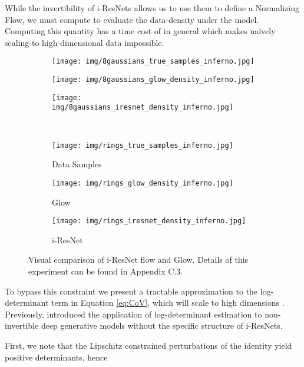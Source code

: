 \documentclass{article}
\begin{document}
While the invertibility of i-ResNets allows us to use them to define a Normalizing Flow, we must compute  to evaluate the data-density under the model. Computing this quantity has a time cost of   in general which makes na\"{i}vely scaling to high-dimensional data impossible. 



\begin{figure}
    \centering
    \begin{subfigure}[b]{0.33\linewidth}
    \centering
    \texttt{[image: img/8gaussians\_true\_samples\_inferno.jpg]}
    \end{subfigure}\begin{subfigure}[b]{0.33\linewidth}
    \centering
    \texttt{[image: img/8gaussians\_glow\_density\_inferno.jpg]}
    \end{subfigure}\begin{subfigure}[b]{0.33\linewidth}
    \centering
    \texttt{[image: img/8gaussians\_iresnet\_density\_inferno.jpg]}
    \end{subfigure}\\
    \begin{subfigure}[b]{0.33\linewidth}
    \centering
    \texttt{[image: img/rings\_true\_samples\_inferno.jpg]}
    \caption*{Data Samples}
    \end{subfigure}\begin{subfigure}[b]{0.33\linewidth}
    \centering
    \texttt{[image: img/rings\_glow\_density\_inferno.jpg]}
    \caption*{Glow}
    \end{subfigure}\begin{subfigure}[b]{0.33\linewidth}
    \centering
    \texttt{[image: img/rings\_iresnet\_density\_inferno.jpg]}
    \caption*{i-ResNet}
    \end{subfigure}
    \caption{Visual comparison of i-ResNet flow and Glow. Details of this experiment can be found in Appendix C.3.}
    \label{fig:toy2d}
\end{figure}

To bypass this constraint we present a tractable approximation to the log-determinant term in Equation \eqref{eq:CoV}, which will scale to high dimensions . Previously, \citet{leCunSpectralBackprop} introduced the application of log-determinant estimation to non-invertible deep generative models without the specific structure of i-ResNets.

First, we note that the Lipschitz constrained perturbations  of the identity yield positive determinants, hence
\end{document}
